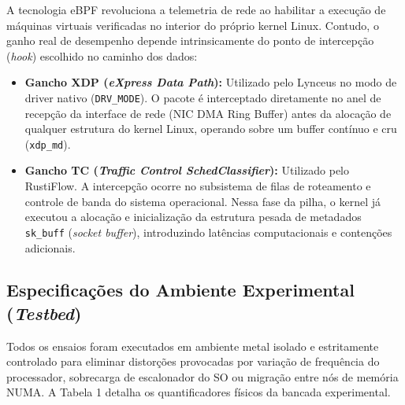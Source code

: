 \documentclass[11pt,a4paper]{article}
\begin{document}
A tecnologia eBPF revoluciona a telemetria de rede ao habilitar a execução de máquinas virtuais verificadas no interior do próprio kernel Linux. Contudo, o ganho real de desempenho depende intrinsicamente do ponto de intercepção (\textit{hook}) escolhido no caminho dos dados:
\begin{itemize}
    \item \textbf{Gancho XDP (\textit{eXpress Data Path}):} Utilizado pelo Lynceus no modo de driver nativo (\texttt{DRV\_MODE}). O pacote é interceptado diretamente no anel de recepção da interface de rede (NIC DMA Ring Buffer) antes da alocação de qualquer estrutura do kernel Linux, operando sobre um buffer contínuo e cru (\texttt{xdp\_md}).
    \item \textbf{Gancho TC (\textit{Traffic Control SchedClassifier}):} Utilizado pelo RustiFlow. A intercepção ocorre no subsistema de filas de roteamento e controle de banda do sistema operacional. Nessa fase da pilha, o kernel já executou a alocação e inicialização da estrutura pesada de metadados \texttt{sk\_buff} (\textit{socket buffer}), introduzindo latências computacionais e contenções adicionais.
\end{itemize}

\subsection{Especificações do Ambiente Experimental (\textit{Testbed})}
Todos os ensaios foram executados em ambiente metal isolado e estritamente controlado para eliminar distorções provocadas por variação de frequência do processador, sobrecarga de escalonador do SO ou migração entre nós de memória NUMA. A Tabela 1 detalha os quantificadores físicos da bancada experimental.
\end{document}
